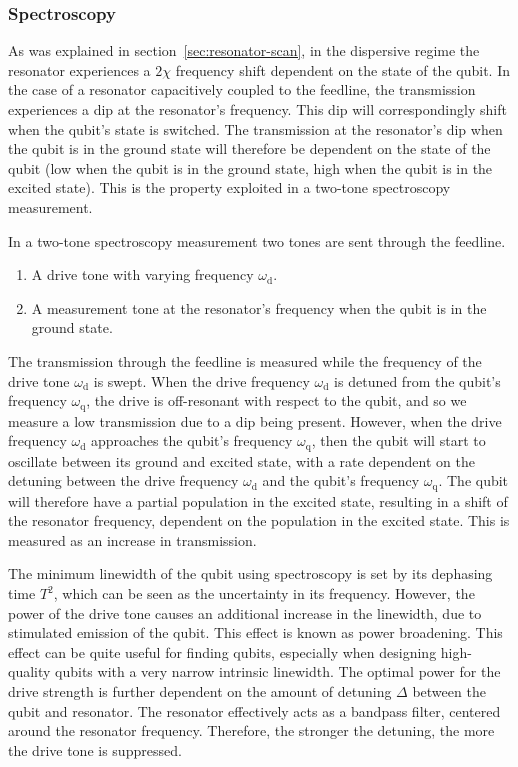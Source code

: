 \documentclass[12pt]{report}
\newcommand{\wqub}{\omega_\text{q}}
\newcommand{\wdrive}{\omega_\text{d}}
\begin{document}
        \subsubsection{Spectroscopy}
          As was explained in section~\ref{sec:resonator-scan}, in the dispersive regime the resonator experiences a $2 \chi$ frequency shift dependent on the state of the qubit. In the case of a resonator capacitively coupled to the feedline, the transmission experiences a dip at the resonator's frequency. This dip will correspondingly shift when the qubit's state is switched. The transmission at the resonator's dip when the qubit is in the ground state will therefore be dependent on the state of the qubit (low when the qubit is in the ground state, high when the qubit is in the excited state). This is the property exploited in a two-tone spectroscopy measurement.

          In a two-tone spectroscopy measurement two tones are sent through the feedline.
          \begin{enumerate}
            \item A drive tone with varying frequency $\wdrive$.
            \item A measurement tone at the resonator's frequency when the qubit is in the ground state.
          \end{enumerate}

          The transmission through the feedline is measured while the frequency of the drive tone $\wdrive$ is swept. When the drive frequency $\wdrive$ is detuned from the qubit's frequency $\wqub$, the drive is off-resonant with respect to the qubit, and so we measure a low transmission due to a dip being present. However, when the drive frequency $\wdrive$ approaches the qubit's frequency $\wqub$, then the qubit will start to oscillate between its ground and excited state, with a rate dependent on the detuning between the drive frequency $\wdrive$ and the qubit's frequency $\wqub$. The qubit will therefore have a partial population in the excited state, resulting in a shift of the resonator frequency, dependent on the population in the excited state. This is measured as an increase in transmission.

          The minimum linewidth of the qubit using spectroscopy is set by its dephasing time $T^2$, which can be seen as the uncertainty in its frequency. However, the power of the drive tone causes an additional increase in the linewidth, due to stimulated emission of the qubit. This effect is known as power broadening. This effect can be quite useful for finding qubits, especially when designing high-quality qubits with a very narrow intrinsic linewidth. The optimal power for the drive strength is further dependent on the amount of detuning $\Delta$ between the qubit and resonator. The resonator effectively acts as a bandpass filter, centered around the resonator frequency. Therefore, the stronger the detuning, the more the drive tone is suppressed.
\end{document}
